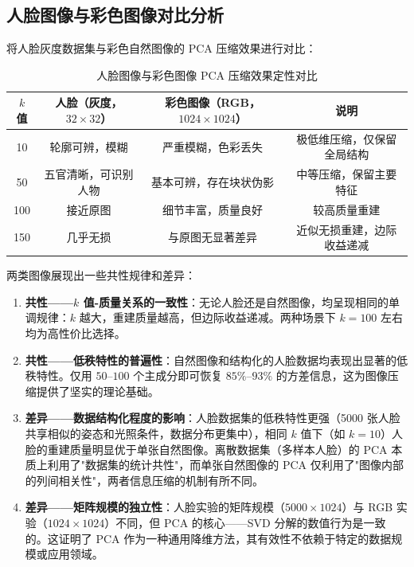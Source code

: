 \documentclass[a4paper]{article}
\begin{document}
\subsection{人脸图像与彩色图像对比分析}

将人脸灰度数据集与彩色自然图像的 PCA 压缩效果进行对比：

\begin{table}[H]
\centering
\caption{人脸图像与彩色图像 PCA 压缩效果定性对比}
\label{tab:comparison}
\begin{tabular}{cccc}
\toprule
$k$ 值 & 人脸（灰度，$32 \times 32$） & 彩色图像（RGB，$1024 \times 1024$） & 说明 \\
\midrule
10  & 轮廓可辨，模糊   & 严重模糊，色彩丢失  & 极低维压缩，仅保留全局结构 \\
50  & 五官清晰，可识别人物 & 基本可辨，存在块状伪影  & 中等压缩，保留主要特征 \\
100 & 接近原图         & 细节丰富，质量良好  & 较高质量重建 \\
150 & 几乎无损         & 与原图无显著差异    & 近似无损重建，边际收益递减 \\
\bottomrule
\end{tabular}
\end{table}

两类图像展现出一些共性规律和差异：

\begin{enumerate}
    \item \textbf{共性——$k$ 值-质量关系的一致性}：无论人脸还是自然图像，均呈现相同的单调规律：$k$ 越大，重建质量越高，但边际收益递减。两种场景下 $k=100$ 左右均为高性价比选择。

    \item \textbf{共性——低秩特性的普遍性}：自然图像和结构化的人脸数据均表现出显著的低秩特性。仅用 $50$--$100$ 个主成分即可恢复 $85\%$--$93\%$ 的方差信息，这为图像压缩提供了坚实的理论基础。

    \item \textbf{差异——数据结构化程度的影响}：人脸数据集的低秩特性更强（5000 张人脸共享相似的姿态和光照条件，数据分布更集中），相同 $k$ 值下（如 $k=10$）人脸的重建质量明显优于单张自然图像。离散数据集（多样本人脸）的 PCA 本质上利用了"数据集的统计共性"，而单张自然图像的 PCA 仅利用了"图像内部的列间相关性"，两者信息压缩的机制有所不同。

    \item \textbf{差异——矩阵规模的独立性}：人脸实验的矩阵规模（$5000 \times 1024$）与 RGB 实验（$1024 \times 1024$）不同，但 PCA 的核心——SVD 分解的数值行为是一致的。这证明了 PCA 作为一种通用降维方法，其有效性不依赖于特定的数据规模或应用领域。
\end{enumerate}
\end{document}
